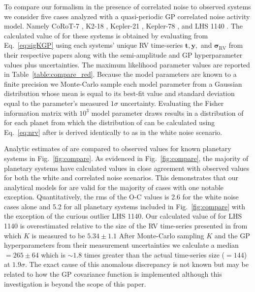 To compare our formalism in the presence of correlated noise to observed systems we consider five cases analyzed
with a quasi-periodic GP correlated noise activity model. Namely CoRoT-7 \citep{haywood14},
K2-18 \citep{cloutier17b}, Kepler-21 \citep{lopezmorales16}, Kepler-78 \citep{grunblatt15}, and
LHS 1140 \citep{dittmann17}. The calculated value of \nrv{} for these systems is obtained by evaluating
\sigK{} from Eq.~\ref{eq:sigKGP} using each systems' unique RV time-series $\mathbf{t},\mathbf{y},$ and
$\boldsymbol{\sigma}_{\text{RV}}$ from their
respective papers along with the semi-amplitude and GP hyperparameter values plus uncertainties.
The maximum likelihood parameter values are reported in Table~\ref{table:compare_red}.
Because the model parameters are known to a finite precision we Monte-Carlo sample each model parameter
from a Gaussian distribution
whose mean is equal to its best-fit value and standard deviation equal to the parameter's measured $1\sigma$
uncertainty. Evaluating the Fisher information matrix with $10^3$ model parameter draws results in a
distribution of \sigK{} for each planet from which the distribution of \nrv{} can be calculated using
Eq.~\ref{eq:nrv} after \sigeff{} is derived identically to as in the white noise scenario.



Analytic estimates of \nrv{} are compared to observed values for known planetary
systems in Fig.~\ref{fig:compare}. As evidenced in Fig.~\ref{fig:compare}, the majority of planetary systems
have calculated \nrv{} values in close agreement with observed values for both the white and correlated noise
scenarios. 
This demonstrates that our analytical models for \nrv{} are valid for the majority of cases
with one notable exception. Quantitatively, the rms of the O-C \nrv{} values is 2.6 for the white noise
cases alone and 5.2 for all planetary systems included in Fig.~\ref{fig:compare} with the exception of
the curious outlier LHS 1140.
Our calculated value of \nrv{} for LHS 1140 is overestimated relative to the
size of the RV time-series presented in \cite{dittmann17} from which $K$ is measured to be $5.34 \pm 1.1$
 After Monte-Carlo sampling $K$ and the GP hyperparameters from their measurement
uncertainties we calculate a median \nrv{}$=265 \pm 64$ which is $\sim 1.8$ times greater than the actual
time-series size (\nrv{}$=144$) at $1.9\sigma$. The exact cause of this anomalous discrepancy is not known
but may be related to how the GP covariance function is implemented although this investigation is
beyond the scope of this paper. 

